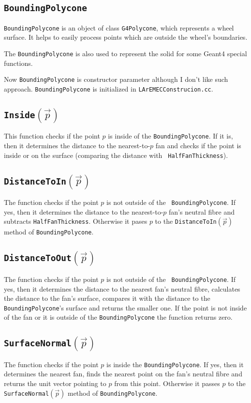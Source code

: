 \documentclass{article}
\begin{document}
\subsection{\tt BoundingPolycone}\label{bpcone}
{\tt BoundingPolycone} is an object of class {\tt G4Polycone}, which represents 
a wheel surface. It helps to easily process points which are outside the wheel's
boundaries.

The {\tt BoundingPolycone} is also used to represent the solid for 
some Geant4 special functions.

Now {\tt BoundingPolycone} is constructor parameter although I don't like such
approach.
{\tt BoundingPolycone} is initialized in {\tt LArEMECConstrucion.cc}.

\subsection{\tt Inside$(\vec{p})$}
This function checks if the point $p$ is inside of the {\tt BoundingPolycone}. If
it is, then it determines the distance to the nearest-to-$p$ fan and 
checks if the
point is inside or on the surface (comparing the distance with {\tt
HalfFanThickness}).

\subsection{\tt DistanceToIn$(\vec{p})$}
The function checks if the point $p$ is not outside of the {\tt
BoundingPolycone}. If yes, then it determines the distance to the nearest-to-$p$
fan's neutral fibre and subtracts {\tt HalfFanThickness}. Otherwise it 
pases $p$ to the {\tt DistanceToIn$(\vec{p})$} method of {\tt BoundingPolycone}. 

\subsection{\tt DistanceToOut$(\vec{p})$}
The function checks if the point $p$ is not outside of the {\tt
BoundingPolycone}. If 
yes, then it determines the distance to the nearest fan's neutral fibre,
calculates the distance to the fan's surface, compares it with the distance to
the {\tt BoundingPolycone}'s surface and returns the smaller one. If the point
is not inside of the fan or it is outside of the {\tt BoundingPolycone} the
function returns zero.

\subsection{\tt SurfaceNormal$(\vec{p})$}
The function checks if the point $p$ is inside the {\tt BoundingPolycone}. If
yes, then it determines the nearest fan, finds the nearest point on the fan's
neutral fibre and returns the unit vector pointing to $p$ from this point.
Otherwise it 
passes $p$ to the {\tt SurfaceNormal$(\vec{p})$} method of {\tt BoundingPolycone}.
\end{document}
